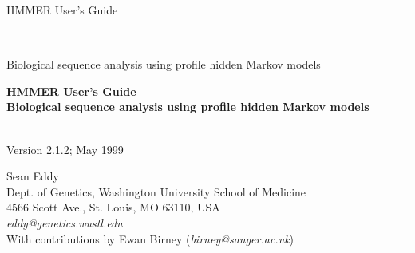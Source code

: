 \begin{titlepage}
{\Large

\vspace*{\fill}

\begin{latexonly}
\noindent
{\Huge \textsf{HMMER User's Guide}} \\ 
\rule[2pt]{\textwidth}{1pt} \\
\hspace*{\fill} {\large \textsf{Biological sequence analysis using
profile hidden Markov models} \\ }
\end{latexonly}

\begin{htmlonly}
\begin{center}
{\Huge \textbf{HMMER User's Guide}}\\
{\large \textbf{Biological sequence analysis using
profile hidden Markov models}}\\
\end{center}
\end{htmlonly}

\vspace*{\fill}

\begin{center}
\textsl{}\\
Version 2.1.2; May 1999 \\ 

\vspace*{\fill}

Sean Eddy\\
Dept. of Genetics, Washington University School of Medicine\\
4566 Scott Ave., St. Louis, MO 63110, USA\\
\textsl{eddy@genetics.wustl.edu} \\
With contributions by Ewan Birney (\textsl{birney@sanger.ac.uk})\\
\end{center}

\vspace*{\fill}

}
\end{titlepage}
